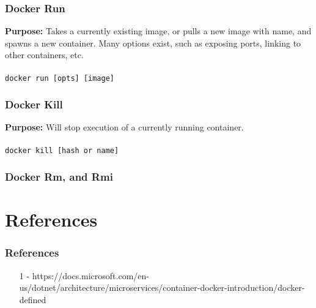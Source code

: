 \documentclass{beamer}
\begin{document}
\begin{frame}\frametitle{Docker Run}
  \textbf{Purpose:} Takes a currently existing image, or pulls a new image with name, and spawns a new container.  Many options exist, such as exposing ports, linking to other containers, etc.
  \\ \\
  \texttt{docker run [opts] [image]}
\end{frame}

\begin{frame}\frametitle{Docker Kill}
  \textbf{Purpose:} Will stop execution of a currently running container.
  \\ \\
  \texttt{docker kill [hash or name]}  
\end{frame}

\begin{frame}\frametitle{Docker Rm, and Rmi}
\end{frame}

\section{References}
\begin{frame}\frametitle{References}
  \begin{itemize}
    \item [1] - https://docs.microsoft.com/en-us/dotnet/architecture/microservices/container-docker-introduction/docker-defined
  \end{itemize}
\end{frame}
\end{document}
